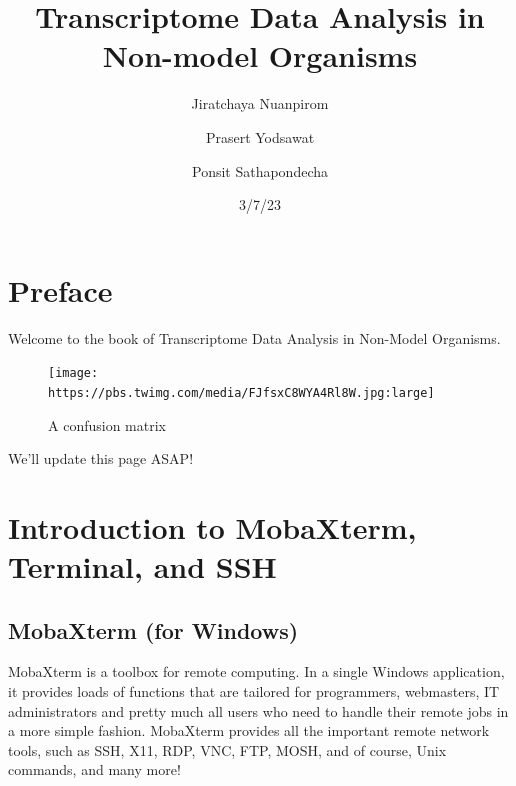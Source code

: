 \documentclass[
  letterpaper,
  DIV=11,
  numbers=noendperiod]{scrreprt}
\title{Transcriptome Data Analysis in Non-model Organisms}
\author{Jiratchaya Nuanpirom \and Prasert Yodsawat \and Ponsit
Sathapondecha}
\date{3/7/23}
\renewcommand*\contentsname{Table of contents}
\newcommand\contentsname{Table of contents}
\begin{document}
\maketitle
\ifdefined\Shaded\renewenvironment{Shaded}{\begin{tcolorbox}[frame hidden, enhanced, boxrule=0pt, interior hidden, borderline west={3pt}{0pt}{shadecolor}, breakable, sharp corners]}{\end{tcolorbox}}\fi

\renewcommand*\contentsname{Table of contents}
{
\hypersetup{linkcolor=}
\setcounter{tocdepth}{2}
\tableofcontents
}

\hypertarget{preface}{%
\chapter*{Preface}\label{preface}}


Welcome to the book of Transcriptome Data Analysis in Non-Model
Organisms.

\begin{figure}

{\centering \texttt{[image: https://pbs.twimg.com/media/FJfsxC8WYA4Rl8W.jpg:large]}

}

\caption{A confusion matrix}

\end{figure}

We'll update this page ASAP!


\hypertarget{introduction-to-mobaxterm-terminal-and-ssh}{%
\chapter{Introduction to MobaXterm, Terminal, and
SSH}\label{introduction-to-mobaxterm-terminal-and-ssh}}

\hypertarget{mobaxterm-for-windows}{%
\section{MobaXterm (for Windows)}\label{mobaxterm-for-windows}}

MobaXterm is a toolbox for remote computing. In a single Windows
application, it provides loads of functions that are tailored for
programmers, webmasters, IT administrators and pretty much all users who
need to handle their remote jobs in a more simple fashion. MobaXterm
provides all the important remote network tools, such as SSH, X11, RDP,
VNC, FTP, MOSH, and of course, Unix commands, and many more!
\end{document}
